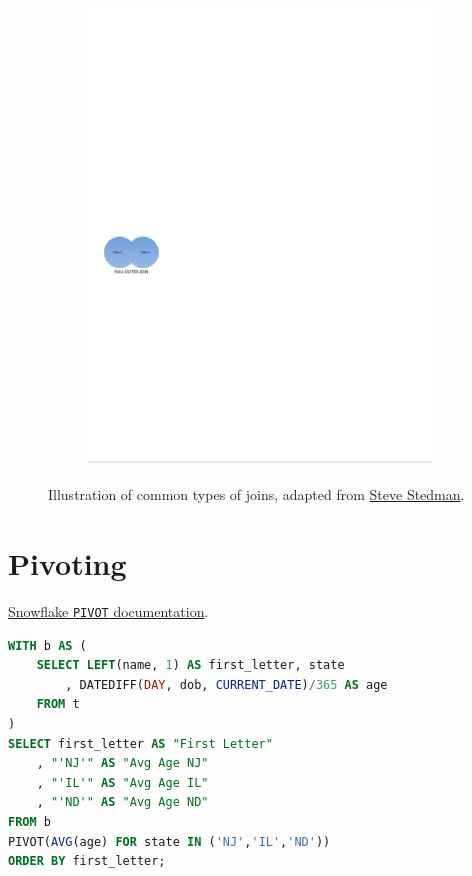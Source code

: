 \begin{figure}[H]
\begin{subfigure}[c]{0.3\textwidth}
  \includegraphics[width=\textwidth]{figures/sql/full_outer_join}
  \label{fig:sql:joins:full_outer_join}
  \end{subfigure}
\caption{
Illustration of common types of joins,
adapted from \href{http://stevestedman.com/2015/03/sql-server-join-types-poster-version-2}{Steve Stedman}.
}
\label{fig:sql:joins}
\end{figure}

\section{Pivoting}
\label{ssql:pivoting}

\noindent \href{https://docs.snowflake.com/en/sql-reference/constructs/pivot.html}{Snowflake \texttt{PIVOT} documentation}.

\begin{lstlisting}[language=SQL]
WITH b AS (
	SELECT LEFT(name, 1) AS first_letter, state
		, DATEDIFF(DAY, dob, CURRENT_DATE)/365 AS age
	FROM t
)
SELECT first_letter AS "First Letter"
	, "'NJ'" AS "Avg Age NJ"
	, "'IL'" AS "Avg Age IL"
	, "'ND'" AS "Avg Age ND"
FROM b
PIVOT(AVG(age) FOR state IN ('NJ','IL','ND'))
ORDER BY first_letter;
\end{lstlisting}

